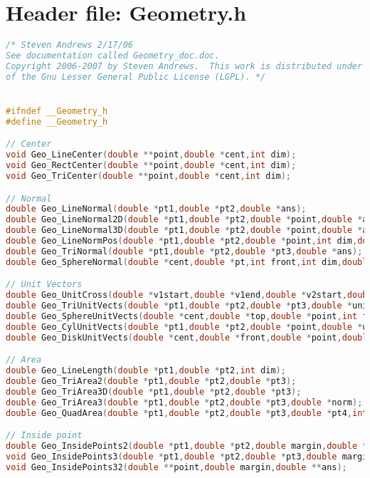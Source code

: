 \documentclass[11pt]{article}
\begin{document}
\maketitle

\section{Header file: Geometry.h}

\begin{lstlisting}[language=C]
/* Steven Andrews 2/17/06
See documentation called Geometry_doc.doc.
Copyright 2006-2007 by Steven Andrews.  This work is distributed under the terms
of the Gnu Lesser General Public License (LGPL). */


#ifndef __Geometry_h
#define __Geometry_h

// Center
void Geo_LineCenter(double **point,double *cent,int dim);
void Geo_RectCenter(double **point,double *cent,int dim);
void Geo_TriCenter(double **point,double *cent,int dim);

// Normal
double Geo_LineNormal(double *pt1,double *pt2,double *ans);
double Geo_LineNormal2D(double *pt1,double *pt2,double *point,double *ans);
double Geo_LineNormal3D(double *pt1,double *pt2,double *point,double *ans);
double Geo_LineNormPos(double *pt1,double *pt2,double *point,int dim,double *distptr);
double Geo_TriNormal(double *pt1,double *pt2,double *pt3,double *ans);
double Geo_SphereNormal(double *cent,double *pt,int front,int dim,double *ans);

// Unit Vectors
double Geo_UnitCross(double *v1start,double *v1end,double *v2start,double *v2end,double *ans);
double Geo_TriUnitVects(double *pt1,double *pt2,double *pt3,double *unit0,double *unit1,double *unit2);
double Geo_SphereUnitVects(double *cent,double *top,double *point,int front,double *unit0,double *unit1,double *unit2);
double Geo_CylUnitVects(double *pt1,double *pt2,double *point,double *unit0,double *unit1,double *unit2);
double Geo_DiskUnitVects(double *cent,double *front,double *point,double *unit0,double *unit1,double *unit2);

// Area
double Geo_LineLength(double *pt1,double *pt2,int dim);
double Geo_TriArea2(double *pt1,double *pt2,double *pt3);
double Geo_TriArea3D(double *pt1,double *pt2,double *pt3);
double Geo_TriArea3(double *pt1,double *pt2,double *pt3,double *norm);
double Geo_QuadArea(double *pt1,double *pt2,double *pt3,double *pt4,int dim);

// Inside point
double Geo_InsidePoints2(double *pt1,double *pt2,double margin,double *ans1,double *ans2,int dim);
void Geo_InsidePoints3(double *pt1,double *pt2,double *pt3,double margin,double *ans1,double *ans2,double *ans3);
void Geo_InsidePoints32(double **point,double margin,double **ans);


\end{lstlisting}
\end{document}
